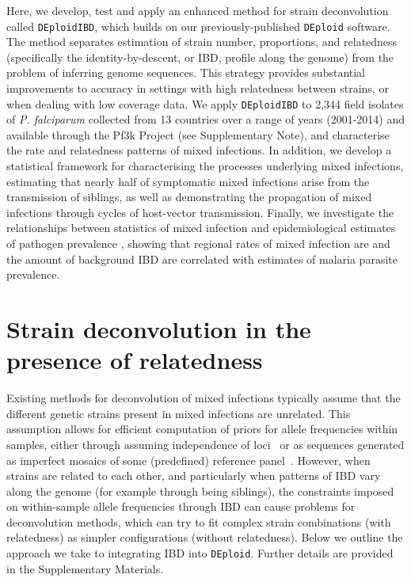 \documentclass[9pt,lineno]{elife}
\begin{document}

Here, we develop, test and apply an enhanced method for strain deconvolution called \texttt{DEploidIBD}, which builds on our previously-published \texttt{DEploid} software.  The method separates estimation of strain number, proportions, and relatedness (specifically the identity-by-descent, or IBD, profile along the genome) from the problem of inferring genome sequences. This strategy provides substantial improvements to accuracy in settings with high relatedness between strains, or when dealing with low coverage data.  We apply \texttt{DEploidIBD} to 2,344 field isolates of {\it P. falciparum} collected from 13 countries over a range of years (2001-2014) and available through the Pf3k Project (see Supplementary Note), and characterise the rate and relatedness patterns of mixed infections.  In addition, we develop a statistical framework for characterising the processes underlying mixed infections, estimating that nearly half of symptomatic mixed infections arise from the transmission of siblings, as well as demonstrating the propagation of mixed infections through cycles of host-vector transmission.  Finally, we investigate the relationships between statistics of mixed infection and epidemiological estimates of pathogen prevalence \citep{MAP2017}, showing that regional rates of mixed infection are and the amount of background IBD are correlated with estimates of malaria parasite prevalence.

\section{Strain deconvolution in the presence of relatedness}

Existing methods for deconvolution of mixed infections typically assume that the different genetic strains present in mixed infections are unrelated.  This assumption allows for efficient computation of priors for allele frequencies within samples, either through assuming independence of loci~\citep{Jack2016} or as sequences generated as imperfect mosaics of some (predefined) reference panel~\citep{Zhu2017}.  However, when strains are related to each other, and particularly when patterns of IBD vary along the genome (for example through being siblings), the constraints imposed on within-sample allele frequencies through IBD can cause problems for deconvolution methods, which can try to fit complex strain combinations (with relatedness) as simpler configurations (without relatedness).  Below we outline the approach we take to integrating IBD into \texttt{DEploid}.  Further details are provided in the Supplementary Materials.
\end{document}
